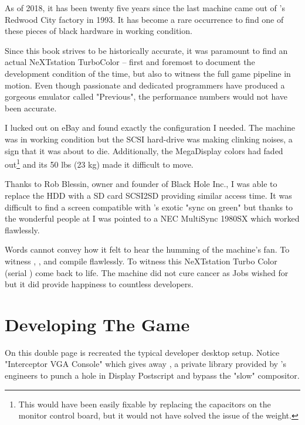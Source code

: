  As of 2018, it has been twenty five years since the last machine came out of \NeXT{}'s Redwood City factory in 1993. It has become a rare occurrence to find one of these pieces of black hardware in working condition.\\
 \par
 Since this book strives to be historically accurate, it was paramount to find an actual NeXTstation TurboColor -- first and foremost to document the development condition of the time, but also to witness the full game pipeline in motion. Even though passionate and dedicated programmers have produced a gorgeous emulator called "Previous", the performance numbers would not have been accurate.\\
 \par
  I lucked out on eBay and found exactly the configuration I needed. The machine was in working condition but the SCSI hard-drive was making clinking noises, a sign that it was about to die. Additionally, the MegaDisplay colors had faded out\footnote{This would have been easily fixable by replacing the capacitors on the monitor control board, but it would not have solved the issue of the weight.} and its 50 lbs (23 kg) made it difficult to move.\\
  \par
  Thanks to Rob Blessin, owner and founder of Black Hole Inc., I was able to replace the HDD with a SD card SCSI2SD providing similar access time. It was difficult to find a screen compatible with \NeXTns{}'s exotic "sync on green" but thanks to the wonderful people at  I was pointed to a NEC MultiSync 1980SX which worked flawlessly.\\
  \par
  Words cannot convey how it felt to hear the humming of the machine's fan. To witness , , and  compile flawlessly. To witness this NeXTstation Turbo Color (serial ) come back to life. The machine did not cure cancer as Jobs wished for but it did provide happiness to countless developers.





\section{Developing The Game}
On this double page is recreated the typical developer desktop setup. Notice "Interceptor VGA Console" which gives away , a private library provided by \NeXTns's engineers to punch a hole in Display Postscript and bypass the "slow" compositor.\\
\par
{}

